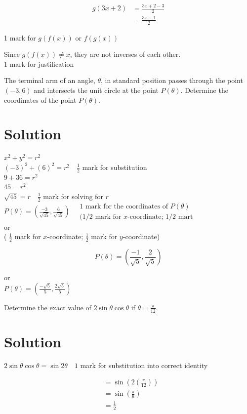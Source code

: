 \documentclass[10pt]{article}
\begin{document}
$$
\begin{aligned}
g(3 x+2) & =\frac{3 x+2-3}{2} \\
& =\frac{3 x-1}{2}
\end{aligned}
$$

1 mark for $g(f(x))$ or $f(g(x))$

Since $g(f(x)) \neq x$, they are not inverses of each other.\\
1 mark for justification

The terminal arm of an angle, $\theta$, in standard position passes through the point $(-3,6)$ and intersects the unit circle at the point $P(\theta)$. Determine the coordinates of the point $P(\theta)$.

\section*{Solution}
$x^{2}+y^{2}=r^{2}$\\
$(-3)^{2}+(6)^{2}=r^{2} \quad \frac{1}{2}$ mark for substitution\\
$9+36=r^{2}$\\
$45=r^{2}$\\
$\sqrt{45}=r \quad \frac{1}{2}$ mark for solving for $r$\\
$P(\theta)=\left(\frac{-3}{\sqrt{45}}, \frac{6}{\sqrt{45}}\right) \quad \begin{array}{r}1 \text { mark for the coordinates of } P(\theta) \\ (1 / 2 \text { mark for } x \text {-coordinate; } 1 / 2 \text { mart }\end{array}$\\
or\\
( $\frac{1}{2}$ mark for $x$-coordinate; $\frac{1}{2}$ mark for $y$-coordinate)

$$
P(\theta)=\left(\frac{-1}{\sqrt{5}}, \frac{2}{\sqrt{5}}\right)
$$

or\\
$P(\theta)=\left(\frac{-\sqrt{5}}{5}, \frac{2 \sqrt{5}}{5}\right)$

Determine the exact value of $2 \sin \theta \cos \theta$ if $\theta=\frac{\pi}{12}$.

\section*{Solution}
$2 \sin \theta \cos \theta=\sin 2 \theta \quad 1$ mark for substitution into correct identity

$$
\begin{aligned}
& =\sin \left(2\left(\frac{\pi}{12}\right)\right) \\
& =\sin \left(\frac{\pi}{6}\right) \\
& =\frac{1}{2}
\end{aligned}
$$
\end{document}
